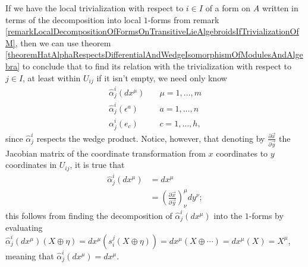 \begin{remark}\label{remarkSufficesEnoughNeedOnlyHatAlphaFor1FormsToTranslateLocalTrivializations}
If we have the local trivialization with respect to $i \in I$ of a form on $A$ written in terms of the decomposition into local $1$-forms from remark \ref{remarkLocalDecompositionOfFormsOnTransitiveLieAlgebroidsIfTrivializationOfM}, then we can use theorem \ref{theoremHatAlphaRespectsDifferentialAndWedgeIsomorphismOfModulesAndAlgebra} to conclude that to find its relation with the trivialization with respect to $j \in I$, at least within $U_{ij}$ if it isn't empty, we need only know 
\begin{align}
    \hat \alpha^i_j(dx^\mu)& \quad \mu = 1, \dots, m \\ 
    \hat \alpha^i_j(\epsilon^a)& \quad a = 1, \dots, n \\
    \alpha^i_j(e_c)& \quad c = 1, \dots, h,
\end{align}
since $\hat \alpha^i_j$ respects the wedge product. Notice, however, that denoting by $\frac{\partial \vec x}{\partial \vec y}$ the Jacobian matrix of the coordinate transformation from $x$ coordinates to $y$ coordinates in $U_{ij}$, it is true that
\begin{align}
    \hat \alpha^i_j(dx^\mu) &= dx^\mu \\
    &= \left(\frac{\partial \vec x}{\partial \vec y}\right)^\mu_\nu dy^\nu;
\end{align}
this follows from finding the decomposition of $\hat \alpha^i_j(dx^\mu)$ into the $1$-forms by evaluating $\hat \alpha^i_j(dx^\mu)(X \oplus \eta) = dx^\mu(s^j_i(X \oplus \eta)) = dx^\mu(X \oplus \cdots) = dx^\mu(X) = X^\mu$, meaning that $\hat \alpha^i_j (dx^\mu) = dx^\mu$.
\end{remark}

\linea 

